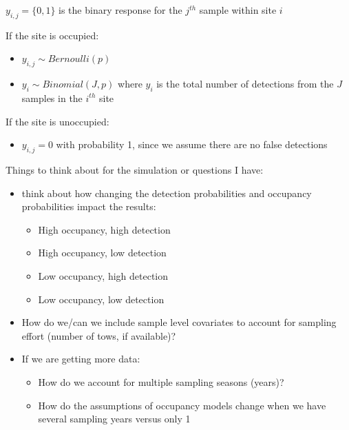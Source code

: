 \documentclass[12pt]{article}\usepackage[]{graphicx}\usepackage[]{color}
\begin{document}
$y_{i,j} = \{0, 1\}$ is the binary response for the $j^{th}$ sample within site $i$

If the site is occupied: 
\begin{itemize}
\item $y_{i,j} \sim Bernoulli(p)$
\item $y_i \sim Binomial(J, p)$ where $y_i$ is the total number of detections from the $J$ samples in the $i^{th}$ site 
\end{itemize}

If the site is unoccupied: 
\begin{itemize}
\item $y_{i,j} = 0$ with probability 1, since we assume there are no false detections
\end{itemize}







Things to think about for the simulation or questions I have: 
\begin{itemize}
\item think about how changing the detection probabilities and occupancy probabilities impact the results: 
	\begin{itemize}
	\item High occupancy, high detection
	\item High occupancy, low detection 
	\item Low occupancy, high detection 
	\item Low occupancy, low detection 
	\end{itemize}
\item How do we/can we include sample level covariates to account for sampling effort (number of tows, if available)?
\item If we are getting more data:
	\begin{itemize}
	\item How do we account for multiple sampling seasons (years)? 
	\item How do the assumptions of occupancy models change when we have several sampling years versus only 1
\end{itemize}
\end{itemize}
\end{document}
